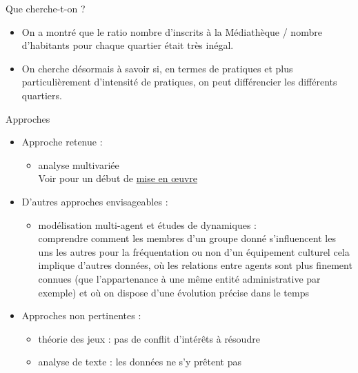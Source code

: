 \documentclass{beamer}
\begin{document}
\begin{frame}{Que cherche-t-on ?}
	\begin{itemize}
		\item On a montré que le ratio nombre d'inscrits à la Médiathèque / nombre d'habitants pour chaque quartier était très inégal.
		\item On cherche désormais à savoir si, en termes de pratiques et plus particulièrement d'intensité de pratiques, on peut différencier les différents quartiers.
	\end{itemize}
\end{frame}

\begin{frame}{Approches}
	\begin{itemize}
		\item Approche retenue :
		\begin{itemize}
			\item analyse multivariée \\ Voir pour un début de \href{https://github.com/ragbx/aqm/blob/master/02_analyse_donnees.ipynb}{mise en œuvre}
		\end{itemize}
		\item D'autres approches envisageables :
		\begin{itemize}
			\item modélisation multi-agent et études de dynamiques :\\
			comprendre comment les membres d'un groupe donné s'influencent les uns les autres pour la fréquentation ou non d'un équipement culturel 
			cela implique d'autres données, où les relations entre agents sont plus finement connues (que l'appartenance à une même entité administrative par exemple) et où on dispose d'une évolution précise dans le temps 
		\end{itemize}
		\item Approches non pertinentes :
		\begin{itemize}
			\item théorie des jeux : pas de conflit d'intérêts à résoudre
			\item analyse de texte : les données ne s'y prêtent pas
		\end{itemize}	
	\end{itemize}
\end{frame}
\end{document}
